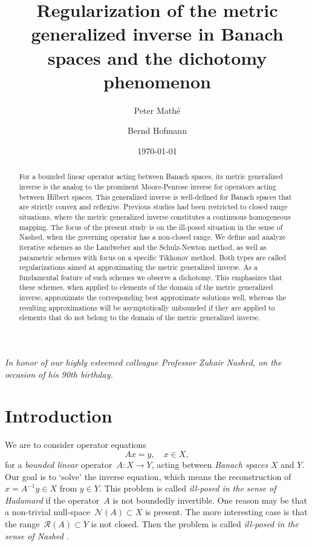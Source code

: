 \documentclass[12pt]{amsart}
\title[Regularization of the metric generalized
inverse]{Regularization of the metric generalized inverse in Banach
  spaces and the dichotomy phenomenon}
\author{Peter Math\'e}
\author{Bernd Hofmann}
\date{\today}
\newcommand{\range}{\mathcal R}
\newcommand{\N}{\mathcal N}
\theoremstyle{remark}
\begin{document}
\begin{abstract}
For a bounded linear operator acting between Banach spaces, its metric generalized inverse is the analog to the prominent Moore-Penrose inverse for operators acting between Hilbert spaces.
This generalized inverse is well-defined for Banach spaces that are strictly convex and reflexive. Previous studies had been restricted to closed range situations, where the metric generalized inverse constitutes a continuous homogeneous mapping. The focus of the present study is on the ill-posed situation in the sense of Nashed, when the governing operator has a non-closed range.
We define and analyze iterative schemes as the Landweber and the Schulz-Newton method, as well as parametric schemes with focus on a specific Tikhonov method. Both types are called regularizations aimed at approximating the metric generalized inverse. As a fundamental feature of such schemes we observe a dichotomy. %
This emphasizes that these schemes, when applied to elements of the domain of the metric generalized inverse, approximate the corresponding best approximate solutions well, whereas the resulting approximations will be asymptotically unbounded if they are applied to elements that do not belong to the domain of the metric generalized inverse.
\end{abstract}
\maketitle
\begin{center}
{\sl In honor of our highly esteemed colleague Professor Zuhair Nashed, on the occasion of his 90th birthday. }
\end{center}   
\section{Introduction}
\label{sec:intro}

We are to consider operator equations
\begin{equation}
  \label{eq:3}
  A x=y,\quad x\in X,
\end{equation}
for a \emph{bounded linear} operator~$A \colon X \to Y$, acting between
\emph{Banach spaces} $X$ and $Y$. Our goal is to `solve' the inverse equation, which means
the reconstruction of $x= A^{-1}y \in X$ from $y\in Y$.
This problem is called \emph{ill-posed in the sense of Hadamard} if the operator~$A$ is
not boundedly invertible. One reason may be that a non-trivial
null-space~$\N(A)\subset X$ is present. The more interesting case is that the
range~$\range(A) \subset Y$ is not closed. Then the problem is called \emph{ill-posed in the sense of Nashed} \cite{Nashed86}.
\end{document}
